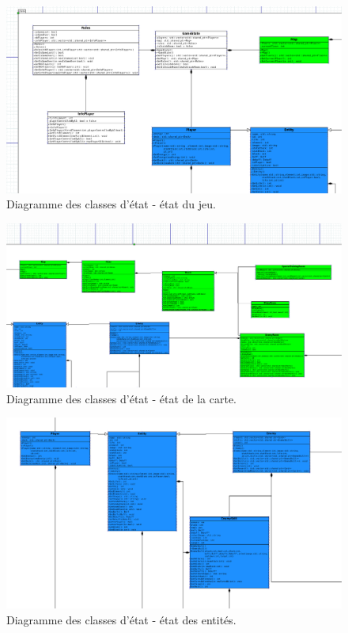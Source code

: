 \begin{landscape}
\begin{figure}[p]
\includegraphics[width=0.8\paperheight]{images/state1.png}
\caption{\label{uml:state}Diagramme des classes d'état - état du jeu.} 
\end{figure}
\end{landscape}

\begin{landscape}
\begin{figure}[p]
\includegraphics[width=0.8\paperheight]{images/state2.png}
\caption{\label{uml:state}Diagramme des classes d'état - état de la carte.} 
\end{figure}
\end{landscape}
\begin{landscape}
\begin{figure}[p]
\includegraphics[width=0.8\paperheight]{images/state3.png}
\caption{\label{uml:state}Diagramme des classes d'état - état des entités.} 
\end{figure}
\end{landscape}

